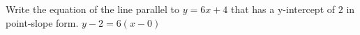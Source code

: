 {Write the equation of the line parallel to $y=6x+4$ that has a y-intercept of $2$ in point-slope form.}
{$y-2=6(x-0)$}
